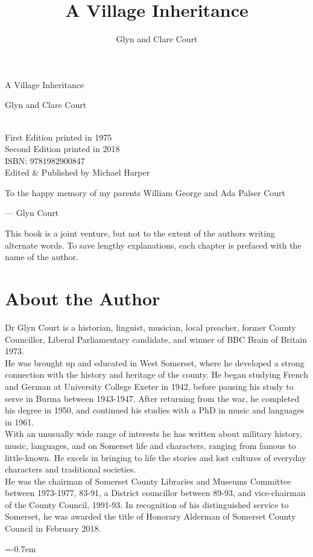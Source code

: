 \documentclass[11pt]{book}
\title{A Village Inheritance}
\author{Glyn and Clare Court}
\newlength\rulew
\renewcommand{\headrulewidth}{0pt} %
\newcommand*{\plogo}{\fbox{\textbf{MH}}} %
\newcommand*{\titleBC}{\begingroup %
\centering %
\huge{A Village Inheritance} %

\vfill %
\Large{Glyn and Clare Court} %

\vfill %
\normalsize
\plogo\\[0.5\baselineskip]
First Edition printed in 1975 \\
Second Edition printed in 2018 \\%
ISBN: 9781982900847 \\
\centering
Edited \& Published by Michael Harper \\


\newpage

To the happy memory of my parents William George and Ada Palser Court \\

\par\raggedleft 
--- Glyn Court


\newpage

\raggedright
This book is a joint venture, but not to the extent of the authors writing alternate words. To save lengthy explanations, each chapter is prefaced with the name of the author.

\endgroup}
\begin{document}
\frontmatter

\thispagestyle{empty}  %
\titleBC 

\newpage

\chapter*{About the Author}

Dr Glyn Court is a historian, linguist, musician, local preacher, former County Councillor, Liberal Parliamentary candidate, and winner of BBC Brain of Britain 1973.\\

He was brought up and educated in West Somerset, where he developed a strong connection with the history and heritage of the county.  He began studying French and German at University College Exeter in 1942, before pausing his study to serve in Burma between 1943-1947. After returning from the war, he completed his degree in 1950, and continued his studies with a PhD in music and languages in 1961. \\

With an unusually wide range of interests he has written about military history, music, languages, and on Somerset life and characters, ranging from famous to little-known.  He excels in bringing to life the stories and lost cultures of everyday characters and traditional societies.\\

He was the chairman of Somerset County Libraries and Museums Committee between 1973-1977, 83-91, a District councillor between 89-93, and vice-chairman of the County Council, 1991-93. In recognition of his distinguished service to Somerset, he was awarded the title of Honorary Alderman of Somerset County Council in February 2018.

\parskip=-0.7em %
\tableofcontents

\mainmatter	

\setlength{\parskip}{0.75em} %

\fancyhf{}
\renewcommand{\headrulewidth}{0.2pt} %
\fancyhead[RO]{\leftmark}
\fancyfoot[CE,CO]{\thepage}
























\end{document}

